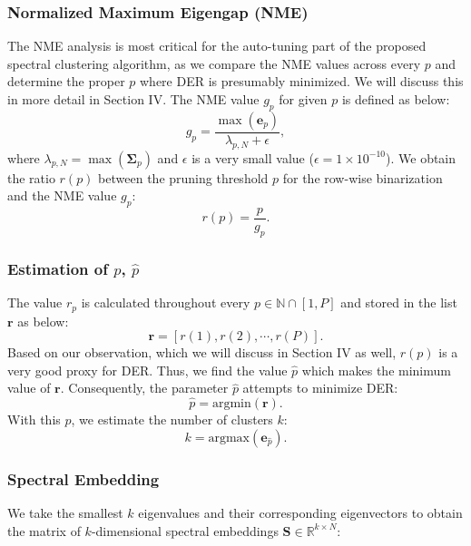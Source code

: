 \documentclass[journal]{IEEEtran}
\begin{document}
    \subsubsection{Normalized Maximum Eigengap (NME)}
    The NME analysis is most critical for the auto-tuning part of the proposed spectral clustering algorithm, as we compare the NME values across every $p$ and determine the proper $p$ where DER is presumably minimized. We will discuss this in more detail in Section IV. The NME value $g_p$ for given $p$ is defined as below:
        \begin{equation}
            g_{p} = \frac{\max(\mathbf{e}_p)}{\lambda_{p,N} + \epsilon},
        \end{equation}
    where $\lambda_{p,N} = \max(\mathbf{\Sigma}_{p})$ and $\epsilon$ is a very small value ($\epsilon=1 \times 10^{-10}$). We obtain the ratio $r(p)$ between the pruning threshold $p$ for the row-wise binarization and the NME value $g_p$:
    \begin{equation}
            \label{r_p}
            r(p) = \frac{p}{g_{p}}.
        \end{equation}
    \subsubsection{Estimation of $p$, $\hat{p}$} 
        The value $r_{p}$ is calculated throughout every $p \in \mathbb{N} \cap [1,P]$ and stored in the list $\textbf{r}$ as below:
        \begin{equation}
            \textbf{r} = [ r(1), r(2), \cdots, r(P) ].
        \end{equation}
        Based on our observation, which we will discuss in Section IV as well, $r(p)$ is a very good proxy for DER. Thus, we find the value $\hat{p}$ which makes the minimum value of $\textbf{r}$. Consequently, the parameter $\hat{p}$ attempts to minimize DER:
        \begin{equation}\label{eq:hat_p}
            \hat{p} = \text{argmin}(\mathbf{r}).
        \end{equation}
        With this $\hat{p}$, we estimate the number of clusters $k$:
        \begin{equation}
            k = \text{argmax}(\mathbf{e}_{\hat{p}}).
        \end{equation}
        
    \subsubsection{Spectral Embedding} We take the smallest $k$ eigenvalues and their corresponding eigenvectors to obtain the matrix of $k$-dimensional spectral embeddings $\mathbf{S} \in \mathbb{R}^{k \times N}$:
    
\end{document}
